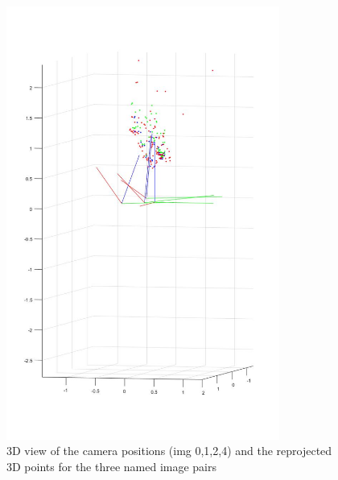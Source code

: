\documentclass[12pt]{article}
\begin{document}
\begin{figure}[H]
	\centering
	\includegraphics[width=0.8\textwidth]{7.jpg}
	\caption{3D view of the camera positions (img 0,1,2,4) and the reprojected 3D points for the three named image pairs}
	\label{fig1}
\end{figure}
\vspace{5mm}
\end{document}
